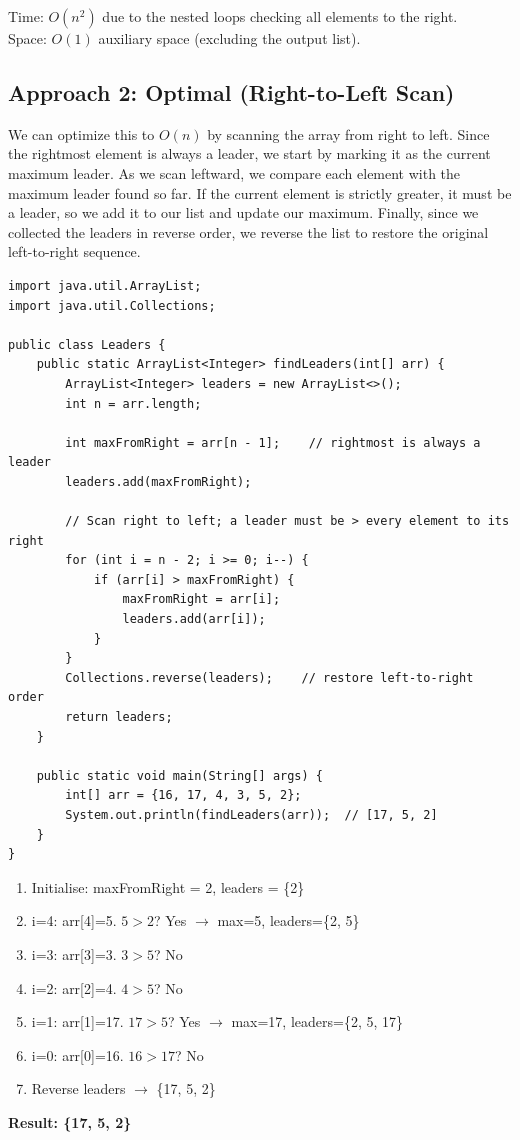 \documentclass[12pt,a4paper,oneside]{book}
\begin{document}
\begin{complexity}
Time: $O(n^2)$ due to the nested loops checking all elements to the right.\\
Space: $O(1)$ auxiliary space (excluding the output list).
\end{complexity}

\subsection{Approach 2: Optimal (Right-to-Left Scan)}
We can optimize this to $O(n)$ by scanning the array from right to left. Since the rightmost element is always a leader, we start by marking it as the current maximum leader. As we scan leftward, we compare each element with the maximum leader found so far. If the current element is strictly greater, it must be a leader, so we add it to our list and update our maximum. Finally, since we collected the leaders in reverse order, we reverse the list to restore the original left-to-right sequence.

\begin{lstlisting}[caption={Leaders in Array --- Right-to-Left scan, O(n)}]
import java.util.ArrayList;
import java.util.Collections;

public class Leaders {
    public static ArrayList<Integer> findLeaders(int[] arr) {
        ArrayList<Integer> leaders = new ArrayList<>();
        int n = arr.length;

        int maxFromRight = arr[n - 1];    // rightmost is always a leader
        leaders.add(maxFromRight);

        // Scan right to left; a leader must be > every element to its right
        for (int i = n - 2; i >= 0; i--) {
            if (arr[i] > maxFromRight) {
                maxFromRight = arr[i];
                leaders.add(arr[i]);
            }
        }
        Collections.reverse(leaders);    // restore left-to-right order
        return leaders;
    }

    public static void main(String[] args) {
        int[] arr = {16, 17, 4, 3, 5, 2};
        System.out.println(findLeaders(arr));  // [17, 5, 2]
    }
}
\end{lstlisting}

\begin{dryrun}[Dry Run: arr = \{16, 17, 4, 3, 5, 2\}]
\begin{enumerate}
  \item Initialise: maxFromRight = 2, leaders = \{2\}
  \item i=4: arr[4]=5. $5 > 2$? Yes $\to$ max=5, leaders=\{2, 5\}
  \item i=3: arr[3]=3. $3 > 5$? No
  \item i=2: arr[2]=4. $4 > 5$? No
  \item i=1: arr[1]=17. $17 > 5$? Yes $\to$ max=17, leaders=\{2, 5, 17\}
  \item i=0: arr[0]=16. $16 > 17$? No
  \item Reverse leaders $\to$ \{17, 5, 2\}
\end{enumerate}
\textbf{Result: \{17, 5, 2\}}
\end{dryrun}
\end{document}
